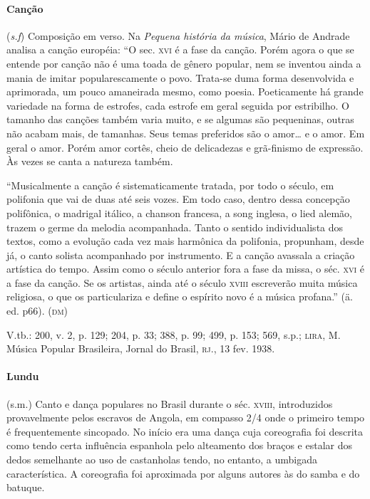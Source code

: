 \paragraph{Canção} (\emph{s.f}) Composição em verso. Na \emph{Pequena
história da música}, Mário de Andrade analisa a canção européia: ``O
sec. \textsc{xvi} é a fase da canção. Porém agora o que se entende por canção não
é uma toada de gênero popular, nem se inventou ainda a mania de imitar
popularescamente o povo. Trata-se duma forma desenvolvida e aprimorada,
um pouco amaneirada mesmo, como poesia. Poeticamente há grande variedade
na forma de estrofes, cada estrofe em geral seguida por estribilho. O
tamanho das canções também varia muito, e se algumas são pequeninas,
outras não acabam mais, de tamanhas. Seus temas preferidos são o
amor\ldots{} e o amor. Em geral o amor. Porém amor cortês, cheio de
delicadezas e grã-finismo de expressão. Às vezes se canta a natureza
também.

``Musicalmente a canção é sistematicamente tratada, por todo o século,
em polifonia que vai de duas até seis vozes. Em todo caso, dentro dessa
concepção polifônica, o madrigal itálico, a chanson francesa, a song
inglesa, o lied alemão, trazem o germe da melodia acompanhada. Tanto o
sentido individualista dos textos, como a evolução cada vez mais
harmônica da polifonia, propunham, desde já, o canto solista acompanhado
por instrumento. E a canção avassala a criação artística do tempo. Assim
como o século anterior fora a fase da missa, o séc. \textsc{xvi} é a fase da
canção. Se os artistas, ainda até o século \textsc{xviii} escreverão muita música
religiosa, o que os particulariza e define o espírito novo é a música
profana.'' (ä. ed. p66). (\textsc{dm})

V.tb.: 200, v. 2, p. 129; 204, p. 33; 388, p. 99; 499, p. 153; 569,
s.p.; \textsc{lira}, M. Música Popular Brasileira, Jornal do Brasil, \textsc{rj}., 13 fev.
1938.

\paragraph{Lundu} (s.m.) Canto e dança populares no Brasil durante o séc.
\textsc{xviii}, introduzidos provavelmente pelos escravos de Angola, em compasso
2/4 onde o primeiro tempo é frequentemente sincopado. No início era uma
dança cuja coreografia foi descrita como tendo certa influência
espanhola pelo alteamento dos braços e estalar dos dedos semelhante ao
uso de castanholas tendo, no entanto, a umbigada característica. A
coreografia foi aproximada por alguns autores às do samba e do
batuque.

